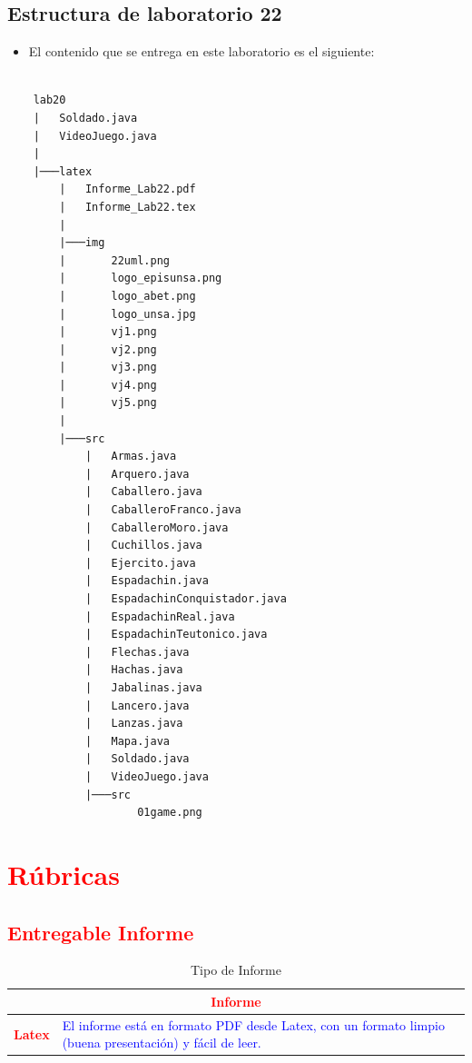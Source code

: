 \documentclass{article}
\newcommand{\itemPracticeNumber}{22}
\begin{document}
\newpage

\subsection{Estructura de laboratorio \itemPracticeNumber} %
\begin{itemize}	
	\item El contenido que se entrega en este laboratorio es el siguiente:
\end{itemize}


\begin{lstlisting}[style=ascii-tree]

    lab20
    |   Soldado.java
    |   VideoJuego.java
    |
    |───latex
        |   Informe_Lab22.pdf
        |   Informe_Lab22.tex
        |
        |───img
        |       22uml.png           
        |       logo_episunsa.png  
        |       logo_abet.png      
        |       logo_unsa.jpg      
        |       vj1.png           
        |       vj2.png           
        |       vj3.png           
        |       vj4.png           
        |       vj5.png           
        |
        |───src
            |   Armas.java
            |   Arquero.java
            |   Caballero.java
            |   CaballeroFranco.java
            |   CaballeroMoro.java
            |   Cuchillos.java
            |   Ejercito.java
            |   Espadachin.java
            |   EspadachinConquistador.java
            |   EspadachinReal.java
            |   EspadachinTeutonico.java
            |   Flechas.java
            |   Hachas.java
            |   Jabalinas.java
            |   Lancero.java
            |   Lanzas.java
            |   Mapa.java
            |   Soldado.java
            |   VideoJuego.java
            |───src
                    01game.png

\end{lstlisting}    

\section{\textcolor{red}{Rúbricas}}
	
\subsection{\textcolor{red}{Entregable Informe}}
	\begin{table}[H]
		\caption{Tipo de Informe}
		\setlength{\tabcolsep}{0.5em} %
		{\renewcommand{\arraystretch}{1.5} %
		\begin{tabular}{|p{3cm}|p{12cm}|}
			\hline
			\multicolumn{2}{|c|}{\textbf{\textcolor{red}{Informe}}}  \\
			\hline 
			\textbf{\textcolor{red}{Latex}} & \textcolor{blue}{El informe está en formato PDF desde Latex,  con un formato limpio (buena presentación) y fácil de leer.}   \\ 
			\hline 
		\end{tabular}
	}
	\end{table}
	
\end{document}
